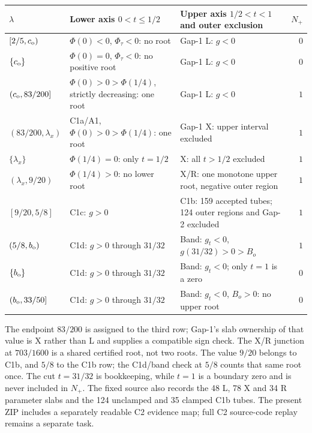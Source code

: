 \begin{center}
\begingroup\footnotesize
\setlength{\tabcolsep}{3pt}\renewcommand{\arraystretch}{1.12}
\begin{tabularx}{\linewidth}{@{}p{29mm}p{43mm}Xr@{}}
\toprule
$\lambda$ & Lower axis $0<t\le1/2$ & Upper axis $1/2<t<1$ and outer exclusion & $N_+$\\
\midrule
$[2/5,c_{\mathrm o})$ & $\Phi(0)<0$, $\Phi_\tau<0$: no root & Gap-1 L: $g<0$ & $0$\\
$\{c_{\mathrm o}\}$ & $\Phi(0)=0$, $\Phi_\tau<0$: no positive root & Gap-1 L: $g<0$ & $0$\\
$(c_{\mathrm o},83/200]$ & $\Phi(0)>0>\Phi(1/4)$, strictly decreasing: one root & Gap-1 L: $g<0$ & $1$\\
$(83/200,\lambda_x)$ & C1a/A1, $\Phi(0)>0>\Phi(1/4)$: one root & Gap-1 X: upper interval excluded & $1$\\
$\{\lambda_x\}$ & $\Phi(1/4)=0$: only $t=1/2$ & X: all $t>1/2$ excluded & $1$\\
$(\lambda_x,9/20)$ & $\Phi(1/4)>0$: no lower root & X/R: one monotone upper root, negative outer region & $1$\\
$[9/20,5/8]$ & C1c: $g>0$ & C1b: 159 accepted tubes; 124 outer regions and Gap-2 excluded & $1$\\
$(5/8,b_{\mathrm o})$ & C1d: $g>0$ through $31/32$ & Band: $g_t<0$, $g(31/32)>0>B_o$ & $1$\\
$\{b_{\mathrm o}\}$ & C1d: $g>0$ through $31/32$ & Band: $g_t<0$; only $t=1$ is a zero & $0$\\
$(b_{\mathrm o},33/50]$ & C1d: $g>0$ through $31/32$ & Band: $g_t<0$, $B_o>0$: no upper root & $0$\\
\bottomrule
\end{tabularx}
\endgroup
\end{center}
The endpoint $83/200$ is assigned to the third row; Gap-1's slab
ownership of that value is X rather than L and supplies a compatible
sign check. The X/R junction at $703/1600$ is a shared certified
root, not two roots. The value $9/20$ belongs to C1b, and $5/8$ to
the C1b row; the C1d/band check at $5/8$ counts that same root
once. The cut $t=31/32$ is bookkeeping, while $t=1$ is a boundary
zero and is never included in $N_+$. The fixed source also records
the 48 L, 78 X and 34 R parameter slabs and the 124 unclamped and
35 clamped C1b tubes. The present ZIP includes a separately readable
C2 evidence map; full C2 source-code replay remains a separate task.

